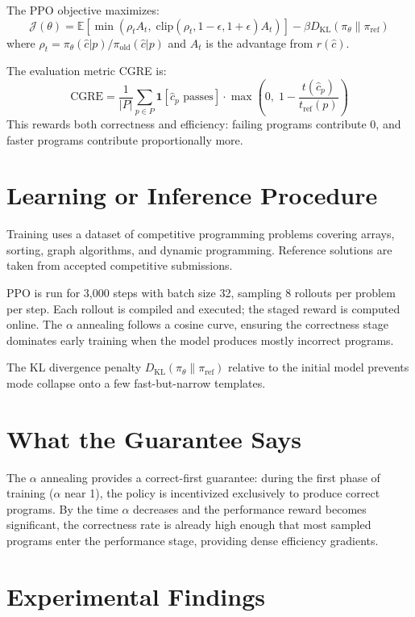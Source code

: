 \documentclass[10pt,twocolumn]{article}
\begin{document}
The PPO objective maximizes:
\[
  \mathcal{J}(\theta) = \mathbb{E}\!\left[
    \min\!\left(\rho_t A_t,\;
      \mathrm{clip}(\rho_t, 1{-}\epsilon, 1{+}\epsilon) A_t
    \right)
  \right] - \beta D_{\mathrm{KL}}(\pi_\theta \| \pi_{\mathrm{ref}})
\]
where $\rho_t = \pi_\theta(\hat{c}|p)/\pi_{\mathrm{old}}(\hat{c}|p)$
and $A_t$ is the advantage from $r(\hat{c})$.

The evaluation metric CGRE is:
\[
  \text{CGRE} = \frac{1}{|P|}\sum_{p\in P}
  \mathbf{1}[\hat{c}_p\text{ passes}] \cdot
  \max\!\!\left(0,\; 1 - \frac{t(\hat{c}_p)}{t_{\mathrm{ref}}(p)}\right)
\]
This rewards both correctness and efficiency: failing programs
contribute 0, and faster programs contribute proportionally more.

\section{Learning or Inference Procedure}

Training uses a dataset of competitive programming problems covering
arrays, sorting, graph algorithms, and dynamic programming. Reference
solutions are taken from accepted competitive submissions.

PPO is run for 3,000 steps with batch size 32, sampling 8 rollouts per
problem per step. Each rollout is compiled and executed; the staged reward
is computed online. The $\alpha$ annealing follows a cosine curve,
ensuring the correctness stage dominates early training when the model
produces mostly incorrect programs.

The KL divergence penalty $D_{\mathrm{KL}}(\pi_\theta \| \pi_{\mathrm{ref}})$
relative to the initial model prevents mode collapse onto a few fast-but-narrow
templates.

\section{What the Guarantee Says}

The $\alpha$ annealing provides a correct-first guarantee: during the first
phase of training ($\alpha$ near 1), the policy is incentivized exclusively
to produce correct programs. By the time $\alpha$ decreases and the
performance reward becomes significant, the correctness rate is already high
enough that most sampled programs enter the performance stage, providing
dense efficiency gradients.

\section{Experimental Findings}
\end{document}
